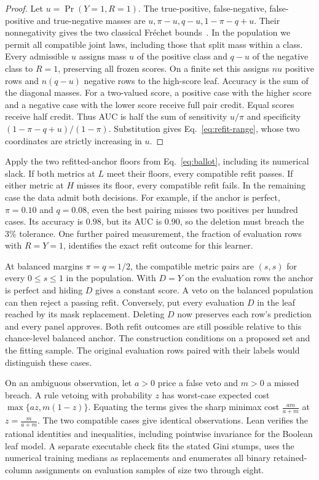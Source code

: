 \begin{proof}
Let $u=\Pr(Y=1,R=1)$. The true-positive, false-negative, false-positive and true-negative masses are $u,\pi-u,q-u,1-\pi-q+u$. Their nonnegativity gives the two classical Fr\'echet bounds~\cite{frechet1951margins}. In the population we permit all compatible joint laws, including those that split mass within a class. Every admissible $u$ assigns mass $u$ of the positive class and $q-u$ of the negative class to $R=1$, preserving all frozen scores. On a finite set this assigns $nu$ positive rows and $n(q-u)$ negative rows to the high-score leaf. Accuracy is the sum of the diagonal masses. For a two-valued score, a positive case with the higher score and a negative case with the lower score receive full pair credit. Equal scores receive half credit. Thus AUC is half the sum of sensitivity $u/\pi$ and specificity $(1-\pi-q+u)/(1-\pi)$. Substitution gives Eq.~\eqref{eq:refit-range}, whose two coordinates are strictly increasing in $u$.
\end{proof}

Apply the two refitted-anchor floors from Eq.~\eqref{eq:ballot}, including its numerical slack. If both metrics at $L$ meet their floors, every compatible refit passes. If either metric at $H$ misses its floor, every compatible refit fails. In the remaining case the data admit both decisions. For example, if the anchor is perfect, $\pi=0.10$ and $q=0.08$, even the best pairing misses two positives per hundred cases. Its accuracy is $0.98$, but its AUC is $0.90$, so the deletion must breach the $3\%$ tolerance. One further paired measurement, the fraction of evaluation rows with $R=Y=1$, identifies the exact refit outcome for this learner.

At balanced margins $\pi=q=1/2$, the compatible metric pairs are $(s,s)$ for every $0\le s\le1$ in the population. With $D=Y$ on the evaluation rows the anchor is perfect and hiding $D$ gives a constant score. A veto on the balanced population can then reject a passing refit. Conversely, put every evaluation $D$ in the leaf reached by its mask replacement. Deleting $D$ now preserves each row's prediction and every panel approves. Both refit outcomes are still possible relative to this chance-level balanced anchor. The construction conditions on a proposed set and the fitting sample. The original evaluation rows paired with their labels would distinguish these cases.

On an ambiguous observation, let $a>0$ price a false veto and $m>0$ a missed breach. A rule vetoing with probability $z$ has worst-case expected cost $\max\{az,m(1-z)\}$. Equating the terms gives the sharp minimax cost $\tfrac{am}{a+m}$ at $z=\tfrac{m}{a+m}$. The two compatible cases give identical observations. Lean verifies the rational identities and inequalities, including pointwise invariance for the Boolean leaf model. A separate executable check fits the stated Gini stumps, uses the numerical training medians as replacements and enumerates all binary retained-column assignments on evaluation samples of size two through eight.


